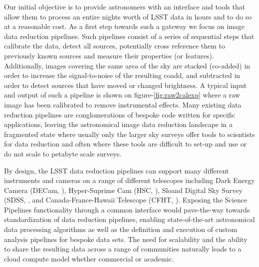 \documentclass[a4paper, 10pt, conference]{ieeeconf}
\begin{document}

Our initial objective is to provide astronomers with an interface and tools that allow them to process an entire nights worth of LSST data in hours and to do so at a reasonable cost. As a first step towards such a gateway we focus on image data reduction pipelines. Such pipelines  consist of a series of sequential steps that calibrate the data, detect all sources, potentially cross reference them to previously known sources and measure their properties (or features). Additionally, images covering the same area of the sky are stacked (co-added) in order to increase the signal-to-noise of the resulting coadd, and subtracted  in order to detect sources that have moved or changed brightness. A typical input and output of such a pipeline is shown on figure-\ref{fig:raw2calexp} where a raw image has been calibrated to remove instrumental effects. Many existing data reduction pipelines are conglomerations of bespoke code written for specific applications, leaving the astronomical image data reduction landscape in a fragmented state where usually only the larger sky surveys offer tools to scientists for data reduction and often where these tools are difficult to set-up and use or do not scale to petabyte scale surveys.

By design, the LSST data reduction pipelines can support many different instruments and cameras on a range of different telescopes including  Dark Energy Camera (DECam, \cite{DECam}), Hyper-Suprime Cam (HSC, \cite{HSC}), Sloand Digital Sky Survey (SDSS, \cite{SDSS}, and Canada-France-Hawaii Telescope (CFHT, \cite{CFHT}). Exposing the Science Pipelines functionality through a common interface would pave-the-way towards standardization of data reduction pipelines, enabling state-of-the-art astronomical data processing algorithms as well as the definition and execution of custom analysis pipelines for bespoke data sets. The need for scalability and the ability to share the resulting data across a range of communities naturally leads to a cloud compute model whether commercial or academic. 
\end{document}
